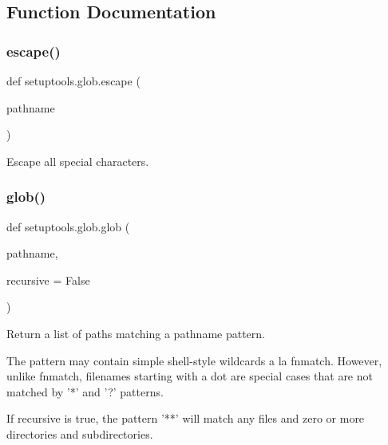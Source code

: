\subsection{Function Documentation}
\mbox{\label{namespacesetuptools_1_1glob_a73ffea4dfe02e8a0294dad20dbb55a0a}} 
\subsubsection{\texorpdfstring{escape()}{escape()}}
{\footnotesize\ttfamily def setuptools.\+glob.\+escape (\begin{DoxyParamCaption}\item[{}]{pathname }\end{DoxyParamCaption})}

\begin{DoxyVerb}Escape all special characters.
\end{DoxyVerb}
 \mbox{\label{namespacesetuptools_1_1glob_aaa3481017d8575f370da9768113e795f}} 
\subsubsection{\texorpdfstring{glob()}{glob()}}
{\footnotesize\ttfamily def setuptools.\+glob.\+glob (\begin{DoxyParamCaption}\item[{}]{pathname,  }\item[{}]{recursive = {\ttfamily False} }\end{DoxyParamCaption})}

\begin{DoxyVerb}Return a list of paths matching a pathname pattern.

The pattern may contain simple shell-style wildcards a la
fnmatch. However, unlike fnmatch, filenames starting with a
dot are special cases that are not matched by '*' and '?'
patterns.

If recursive is true, the pattern '**' will match any files and
zero or more directories and subdirectories.
\end{DoxyVerb}
 \mbox{\label{namespacesetuptools_1_1glob_a75dda51129cf0b110589765487cb12dd}} 
